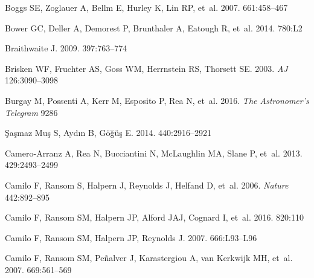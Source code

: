 \documentclass[letterpaper]{ar-1col}
\begin{document}
\begin{thebibliography}{}
{Boggs} SE, {Zoglauer} A, {Bellm} E, {Hurley} K, {Lin} RP, et~al. 2007.
\textit{\apj} 661:458--467

{Bower} GC, {Deller} A, {Demorest} P, {Brunthaler} A, {Eatough} R, et~al. 2014.
\textit{\apjl} 780:L2

{Braithwaite} J. 2009.
\textit{\mnras} 397:763--774

Brisken WF, Fruchter AS, Goss WM, Herrnstein RS, Thorsett SE. 2003.
\textit{AJ} 126:3090--3098

{Burgay} M, {Possenti} A, {Kerr} M, {Esposito} P, {Rea} N, et~al. 2016.
\textit{The Astronomer's Telegram} 9286

{{\c S}a{\c s}maz Mu{\c s}} S, {Ayd{\i}n} B, {G{\"o}{\u g}{\"u}{\c s}} E. 2014.
\textit{\mnras} 440:2916--2921

{Camero-Arranz} A, {Rea} N, {Bucciantini} N, {McLaughlin} MA, {Slane} P, et~al.
  2013.
\textit{\mnras} 429:2493--2499

{Camilo} F, {Ransom} S, {Halpern} J, {Reynolds} J, {Helfand} D, et~al. 2006.
\textit{Nature} 442:892--895

{Camilo} F, {Ransom} SM, {Halpern} JP, {Alford} JAJ, {Cognard} I, et~al. 2016.
\textit{\apj} 820:110

{Camilo} F, {Ransom} SM, {Halpern} JP, {Reynolds} J. 2007{}.
\textit{\apj} 666:L93--L96

{Camilo} F, {Ransom} SM, {Pe{\~n}alver} J, {Karastergiou} A, {van Kerkwijk} MH,
  et~al. 2007{}.
\textit{\apj} 669:561--569


\end{thebibliography}
\end{document}
